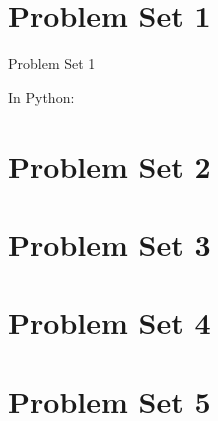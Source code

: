 \section{Problem Set 1}

\begin{problem}{Problem Set 1}
\end{problem}
\begin{solution}
In Python:


\newpage

\end{solution}

\section{Problem Set 2}

\begin{problem}{}
\end{problem}
\begin{solution}
\end{solution}

\section{Problem Set 3}

\begin{problem}{}
\end{problem}
\begin{solution}
\end{solution}

\section{Problem Set 4}

\begin{problem}{}
\end{problem}
\begin{solution}
\end{solution}

\section{Problem Set 5}

\begin{problem}{}
\end{problem}
\begin{solution}
\end{solution}
